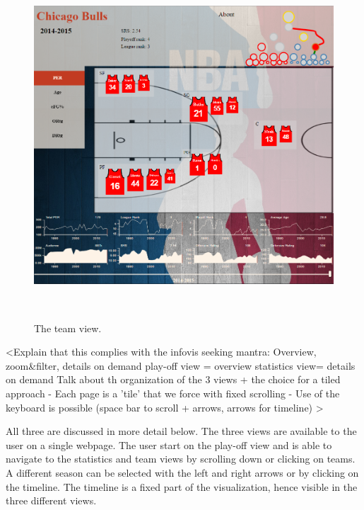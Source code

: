 \documentclass{sigchi}
\begin{document}
\begin{figure}
\centering
  \includegraphics[width=0.9\columnwidth]{figures/teamview}
  \caption{The team view.}~\label{fig:teamview}
\end{figure}

<Explain that this complies with the infovis seeking mantra: Overview, zoom&filter, details on demand
play-off view = overview
statistics view= details on demand
Talk about th organization of the 3 views + the choice for a tiled approach
- Each page is a 'tile' that we force with fixed scrolling
- Use of the keyboard is possible (space bar to scroll + arrows, arrows for timeline)
>

All three are discussed in more detail below. The three views are available to
the user on a single webpage. The user start on the play-off view and is able to
navigate to the statistics and team views by scrolling down or clicking on
teams. A different season can be selected with the left and right arrows or by clicking on the timeline. The timeline is a fixed part of the visualization, hence visible in the three different views.
\end{document}
